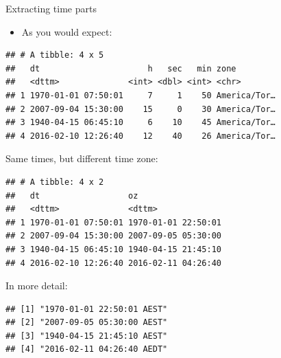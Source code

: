 \documentclass[ignorenonframetext,]{beamer}
\newenvironment{Shaded}{\begin{snugshade}}{\end{snugshade}}
\newcommand{\DataTypeTok}[1]{\textcolor[rgb]{0.13,0.29,0.53}{#1}}
\newcommand{\KeywordTok}[1]{\textcolor[rgb]{0.13,0.29,0.53}{\textbf{#1}}}
\newcommand{\NormalTok}[1]{#1}
\newcommand{\OperatorTok}[1]{\textcolor[rgb]{0.81,0.36,0.00}{\textbf{#1}}}
\newcommand{\StringTok}[1]{\textcolor[rgb]{0.31,0.60,0.02}{#1}}
\providecommand{\tightlist}{%
  \setlength{\itemsep}{0pt}\setlength{\parskip}{0pt}}
\begin{document}
\begin{frame}[fragile]{Extracting time parts}
\protect\hypertarget{extracting-time-parts}{}

\begin{itemize}
\tightlist
\item
  As you would expect:
\end{itemize}

\begin{Shaded}
\end{Shaded}

\begin{verbatim}
## # A tibble: 4 x 5
##   dt                      h   sec   min zone        
##   <dttm>              <int> <dbl> <int> <chr>       
## 1 1970-01-01 07:50:01     7     1    50 America/Tor…
## 2 2007-09-04 15:30:00    15     0    30 America/Tor…
## 3 1940-04-15 06:45:10     6    10    45 America/Tor…
## 4 2016-02-10 12:26:40    12    40    26 America/Tor…
\end{verbatim}

\end{frame}

\begin{frame}[fragile]{Same times, but different time zone:}
\protect\hypertarget{same-times-but-different-time-zone}{}

\begin{Shaded}
\end{Shaded}

\begin{verbatim}
## # A tibble: 4 x 2
##   dt                  oz                 
##   <dttm>              <dttm>             
## 1 1970-01-01 07:50:01 1970-01-01 22:50:01
## 2 2007-09-04 15:30:00 2007-09-05 05:30:00
## 3 1940-04-15 06:45:10 1940-04-15 21:45:10
## 4 2016-02-10 12:26:40 2016-02-11 04:26:40
\end{verbatim}

In more detail:

\begin{verbatim}
## [1] "1970-01-01 22:50:01 AEST"
## [2] "2007-09-05 05:30:00 AEST"
## [3] "1940-04-15 21:45:10 AEST"
## [4] "2016-02-11 04:26:40 AEDT"
\end{verbatim}

\end{frame}
\end{document}
